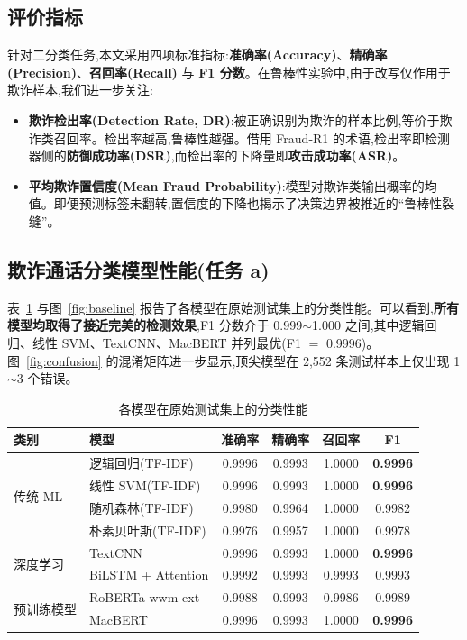 \documentclass[11pt,a4paper]{article}
\begin{document}
\subsection{评价指标}

针对二分类任务,本文采用四项标准指标:\textbf{准确率(Accuracy)}、\textbf{精确率(Precision)}、\textbf{召回率(Recall)} 与 \textbf{F1 分数}。在鲁棒性实验中,由于改写仅作用于欺诈样本,我们进一步关注:

\begin{itemize}[leftmargin=2em,itemsep=0.1em]
\item \textbf{欺诈检出率(Detection Rate, DR)}:被正确识别为欺诈的样本比例,等价于欺诈类召回率。检出率越高,鲁棒性越强。借用 Fraud-R1 的术语,检出率即检测器侧的\textbf{防御成功率(DSR)},而检出率的下降量即\textbf{攻击成功率(ASR)}。
\item \textbf{平均欺诈置信度(Mean Fraud Probability)}:模型对欺诈类输出概率的均值。即便预测标签未翻转,置信度的下降也揭示了决策边界被推近的“鲁棒性裂缝”。
\end{itemize}

\subsection{欺诈通话分类模型性能(任务 a)}

表~\ref{tab:baseline} 与图~\ref{fig:baseline} 报告了各模型在原始测试集上的分类性能。可以看到,\textbf{所有模型均取得了接近完美的检测效果},F1 分数介于 0.999$\sim$1.000 之间,其中逻辑回归、线性 SVM、TextCNN、MacBERT 并列最优(F1 $=$ 0.9996)。图~\ref{fig:confusion} 的混淆矩阵进一步显示,顶尖模型在 2{,}552 条测试样本上仅出现 1$\sim$3 个错误。

\begin{table}[H]
\centering
\caption{各模型在原始测试集上的分类性能}
\label{tab:baseline}
\small
\begin{tabular}{llcccc}
\toprule
\textbf{类别} & \textbf{模型} & \textbf{准确率} & \textbf{精确率} & \textbf{召回率} & \textbf{F1} \\
\midrule
\multirow{4}{*}{传统 ML}
 & 逻辑回归(TF-IDF) & 0.9996 & 0.9993 & 1.0000 & \textbf{0.9996} \\
 & 线性 SVM(TF-IDF) & 0.9996 & 0.9993 & 1.0000 & \textbf{0.9996} \\
 & 随机森林(TF-IDF) & 0.9980 & 0.9964 & 1.0000 & 0.9982 \\
 & 朴素贝叶斯(TF-IDF) & 0.9976 & 0.9957 & 1.0000 & 0.9978 \\
\midrule
\multirow{2}{*}{深度学习}
 & TextCNN & 0.9996 & 0.9993 & 1.0000 & \textbf{0.9996} \\
 & BiLSTM + Attention & 0.9992 & 0.9993 & 0.9993 & 0.9993 \\
\midrule
\multirow{2}{*}{预训练模型}
 & RoBERTa-wwm-ext & 0.9988 & 0.9993 & 0.9986 & 0.9989 \\
 & MacBERT & 0.9996 & 0.9993 & 1.0000 & \textbf{0.9996} \\
\bottomrule
\end{tabular}
\end{table}
\end{document}
